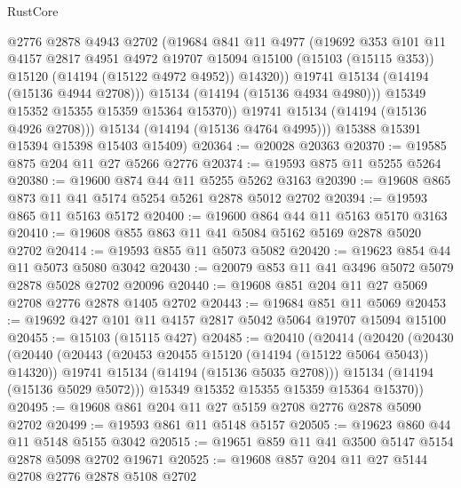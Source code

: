 \begin{lexlean}{RustCore}
\begin{coremodule}
                  @2776
                  @2878
                  @4943
                  @2702
                  (@19684
                    @841
                    @11
                    @4977
                    (@19692
                      @353
                      @101
                      @11
                      @4157
                      @2817
                      @4951
                      @4972
                      @19707
                      @15094
                      @15100
                      (@15103 (@15115 @353))
                      @15120
                      (@14194 (@15122 @4972 @4952))
                      @14320))
                  @19741
                  @15134
                  (@14194 (@15136 @4944 @2708)))
                @15134
                (@14194 (@15136 @4934 @4980)))
              @15349
              @15352
              @15355
              @15359
              @15364
              @15370))
          @19741
          @15134
          (@14194 (@15136 @4926 @2708)))
        @15134
        (@14194 (@15136 @4764 @4995)))
      @15388
      @15391
      @15394
      @15398
      @15403
      @15409)
@20364 := @20028 @20363
@20370 := @19585 @875 @204 @11 @27 @5266 @2776
@20374 := @19593 @875 @11 @5255 @5264
@20380 := @19600 @874 @44 @11 @5255 @5262 @3163
@20390 := @19608 @865 @873 @11 @41 @5174 @5254 @5261 @2878 @5012 @2702
@20394 := @19593 @865 @11 @5163 @5172
@20400 := @19600 @864 @44 @11 @5163 @5170 @3163
@20410 := @19608 @855 @863 @11 @41 @5084 @5162 @5169 @2878 @5020 @2702
@20414 := @19593 @855 @11 @5073 @5082
@20420 := @19623 @854 @44 @11 @5073 @5080 @3042
@20430 := @20079 @853 @11 @41 @3496 @5072 @5079 @2878 @5028 @2702 @20096
@20440 := @19608 @851 @204 @11 @27 @5069 @2708 @2776 @2878 @1405 @2702
@20443 := @19684 @851 @11 @5069
@20453 := @19692 @427 @101 @11 @4157 @2817 @5042 @5064 @19707 @15094 @15100
@20455 := @15103 (@15115 @427)
@20485 := @20410
    (@20414
      (@20420
        (@20430
          (@20440
            (@20443 (@20453 @20455 @15120 (@14194 (@15122 @5064 @5043)) @14320))
            @19741
            @15134
            (@14194 (@15136 @5035 @2708)))
          @15134
          (@14194 (@15136 @5029 @5072)))
        @15349
        @15352
        @15355
        @15359
        @15364
        @15370))
@20495 := @19608 @861 @204 @11 @27 @5159 @2708 @2776 @2878 @5090 @2702
@20499 := @19593 @861 @11 @5148 @5157
@20505 := @19623 @860 @44 @11 @5148 @5155 @3042
@20515 := @19651 @859 @11 @41 @3500 @5147 @5154 @2878 @5098 @2702 @19671
@20525 := @19608 @857 @204 @11 @27 @5144 @2708 @2776 @2878 @5108 @2702

\end{coremodule}
\end{lexlean}
